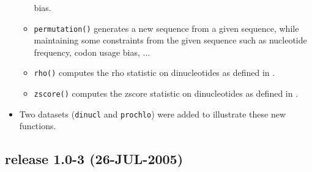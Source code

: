 \documentclass{article}
\begin{document}
\begin{itemize}
\begin{itemize}
      bias.
\item \texttt{permutation()} generates a new sequence from a given
  sequence, while maintaining some constraints from the given sequence
  such as nucleotide frequency, codon usage bias, ...
\item \texttt{rho()} computes the rho statistic on dinucleotides as
  defined in \cite{Karlin}.
\item \texttt{zscore()} computes the zscore statistic on dinucleotides
  as defined in \cite{UV}.
\end{itemize}
\item Two datasets (\texttt{dinucl} and \texttt{prochlo}) were added
  to illustrate these new functions.

\end{itemize}

\subsection*{release 1.0-3 (26-JUL-2005)}
\end{document}
